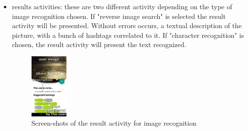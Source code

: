\begin{itemize}
  \item results activities: these are two different activity depending on 
    the type of image recognition chosen. If "reverse image search" is 
    selected the result activity will be presented. Without errors 
    occurs, a textual description of the picture, with a bunch of hashtags 
    correlated to it. If "character recognition" is chosen, the result activity 
    will present the text recognized. %
    \begin{figure}[h]
        \centering
        \includegraphics[width=0.18\textwidth]{../img/image_result_activity}
        \caption{Screen-shots of the result activity for image recognition}
        \label{fig:splash}
    \end{figure}
\end{itemize}

